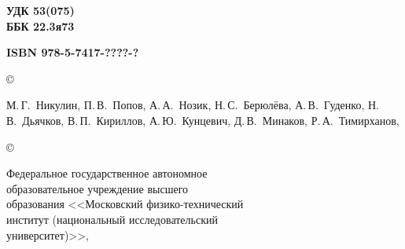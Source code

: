 {\footnotesize
\hfill\parbox{2cm}{\bfseries УДК 53(075)\\
ББК 22.3я73\par}

\vskip 4mm


\settowidth{\vva}{\footnotesize\bf ISBN 978-5-7417-0507-0 (Т.\tom)}%
\noindent
\parbox[t]{\vva}{\footnotesize\bf
ISBN 978-5-7417-????-?
}
\setlength{\vvc}{\textwidth}%
\addtolength{\vvc}{-\vva}%
\setlength{\vvb}{3em}%
\addtolength{\vvc}{-\vvb}%
\hfill
\copyright~\parbox[t]{\vvc}{%
\strut
М.\,Г.~Никулин,
П.\,В.~Попов,
А.\,А.~Нозик,
Н.\,С.~Берюлёва,
А.\,В.~Гуденко,
Н.\,В.~Дьячков,
В.\,П.~Кириллов,
А.\,Ю.~Кунцевич,
Д.\,В.~Минаков,
Р.\,А.~Тимирханов,
\god}

\smallskip

\hfill
\copyright~\parbox[t]{\vvc}{\raggedright
Федеральное государственное автономное\\
образовательное учреждение высшего\\ 
образования <<Московский физико-технический\\ 
институт (национальный исследовательский\\ 
университет)>>, \god}



}

